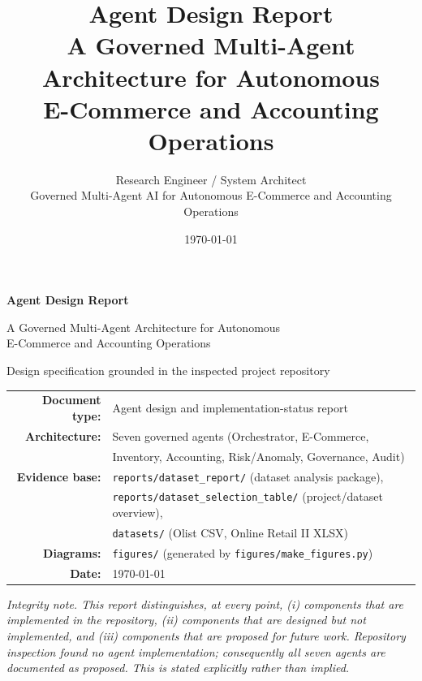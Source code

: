 \documentclass[11pt,a4paper]{article}
\title{\textbf{Agent Design Report}\\[0.4em]
\large A Governed Multi-Agent Architecture for Autonomous\\
E-Commerce and Accounting Operations}
\author{Research Engineer / System Architect\\\small Governed Multi-Agent AI for Autonomous E-Commerce and Accounting Operations}
\date{\today}
\newcommand{\code}[1]{\texttt{#1}}
\begin{document}
\begin{titlepage}
\centering
\vspace*{1.4cm}
{\Huge\bfseries Agent Design Report\par}
\vspace{0.5cm}
{\Large A Governed Multi-Agent Architecture for Autonomous\\[2pt] E-Commerce and Accounting Operations\par}
\vspace{1.0cm}
{\large Design specification grounded in the inspected project repository\par}
\vspace{1.6cm}
\vfill
\begin{tabular}{rl}
\textbf{Document type:} & Agent design and implementation-status report \\[4pt]
\textbf{Architecture:} & Seven governed agents (Orchestrator, E-Commerce, \\
 & Inventory, Accounting, Risk/Anomaly, Governance, Audit) \\[4pt]
\textbf{Evidence base:} & \code{reports/dataset\_report/} (dataset analysis package), \\
 & \code{reports/dataset\_selection\_table/} (project/dataset overview), \\
 & \code{datasets/} (Olist CSV, Online Retail II XLSX) \\[4pt]
\textbf{Diagrams:} & \code{figures/} (generated by \code{figures/make\_figures.py}) \\[4pt]
\textbf{Date:} & \today \\
\end{tabular}
\vfill
{\small\itshape Integrity note. This report distinguishes, at every point, (i) components that are \emph{implemented} in the repository, (ii) components that are \emph{designed but not implemented}, and (iii) components that are \emph{proposed for future work}. Repository inspection found no agent implementation; consequently all seven agents are documented as proposed. This is stated explicitly rather than implied.}
\end{titlepage}
\end{document}
